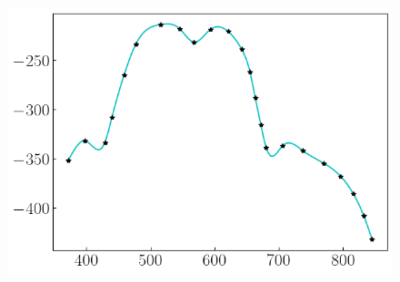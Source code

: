 \documentclass[12pt,a4paper]{article}
\begin{document}
\begin{figure}[H]
    \begin{center}
        \includegraphics[scale=0.75]{./fig4.png} 
    \end{center}
\end{figure}

\end{document}
